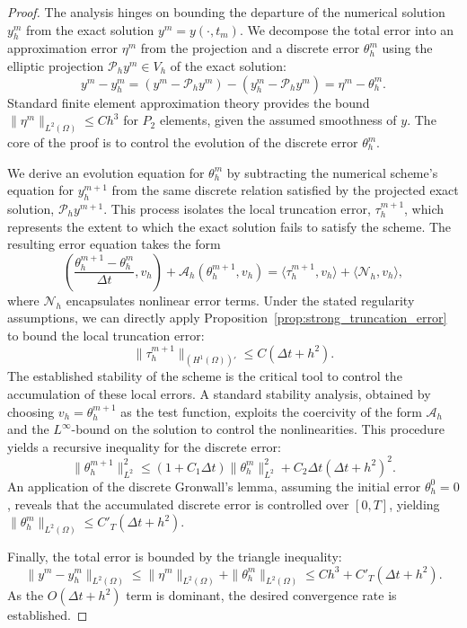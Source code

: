 \documentclass[pdflatex,sn-mathphys-num]{sn-jnl}%
\theoremstyle{thmstyleone}%
\numberwithin{equation}{section}
\newcommand{\inner}[2]{\left( #1, #2 \right)}
\begin{document}
\begin{proof}
The analysis hinges on bounding the departure of the numerical solution $y_h^m$ from the exact solution $y^m = y(\cdot, t_m)$. We decompose the total error into an approximation error $\eta^m$ from the projection and a discrete error $\theta_h^m$ using the elliptic projection $\mathcal{P}_h y^m \in V_h$ of the exact solution:
$$y^m - y_h^m = (y^m - \mathcal{P}_h y^m) - (y_h^m - \mathcal{P}_h y^m) = \eta^m - \theta_h^m.$$
Standard finite element approximation theory provides the bound $\|\eta^m\|_{L^2(\Omega)} \le C h^3$ for $P_2$ elements, given the assumed smoothness of $y$. The core of the proof is to control the evolution of the discrete error $\theta_h^m$.

We derive an evolution equation for $\theta_h^m$ by subtracting the numerical scheme's equation for $y_h^{m+1}$ from the same discrete relation satisfied by the projected exact solution, $\mathcal{P}_h y^{m+1}$. This process isolates the local truncation error, $\tau_h^{m+1}$, which represents the extent to which the exact solution fails to satisfy the scheme. The resulting error equation takes the form
$$\inner{\frac{\theta_h^{m+1} - \theta_h^m}{\Delta t}}{v_h} + \mathcal{A}_h(\theta_h^{m+1}, v_h) = \langle \tau_h^{m+1}, v_h \rangle + \langle \mathcal{N}_h, v_h \rangle,$$
where $\mathcal{N}_h$ encapsulates nonlinear error terms. Under the stated regularity assumptions, we can directly apply Proposition~\ref{prop:strong_truncation_error} to bound the local truncation error:
$$ \| \tau_h^{m+1} \|_{(H^1(\Omega))'} \le C(\Delta t + h^2). $$
The established stability of the scheme is the critical tool to control the accumulation of these local errors. A standard stability analysis, obtained by choosing $v_h = \theta_h^{m+1}$ as the test function, exploits the coercivity of the form $\mathcal{A}_h$ and the $L^\infty$-bound on the solution to control the nonlinearities. This procedure yields a recursive inequality for the discrete error:
$$\|\theta_h^{m+1}\|^2_{L^2} \le (1 + C_1 \Delta t) \|\theta_h^m\|^2_{L^2} + C_2 \Delta t (\Delta t + h^2)^2.$$
An application of the discrete Gronwall's lemma, assuming the initial error $\theta_h^0 = 0$, reveals that the accumulated discrete error is controlled over $[0,T]$, yielding $\|\theta_h^m\|_{L^2(\Omega)} \le C'_T (\Delta t + h^2)$.

Finally, the total error is bounded by the triangle inequality:
$$\|y^m - y_h^m\|_{L^2(\Omega)} \le \|\eta^m\|_{L^2(\Omega)} + \|\theta_h^m\|_{L^2(\Omega)} \le C h^3 + C'_T(\Delta t + h^2).$$
As the $O(\Delta t + h^2)$ term is dominant, the desired convergence rate is established.
\end{proof}
\end{document}
